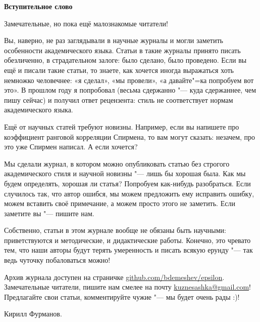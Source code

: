 \documentclass[11pt]{article}
\begin{document}
\pagestyle{empty}

\begin{center}
\Large\textbf{Вступительное слово}
\end{center}


Замечательные, но пока ещё малознакомые читатели!

Вы, наверно, не раз заглядывали в научные журналы и могли заметить особенности академического языка. Статьи в такие журналы принято писать обезличенно, в страдательном залоге: было сделано, было проведено. Если вы ещё и писали такие статьи, то знаете, как хочется иногда выражаться хоть немножко человечнее: «я сделал», «мы провели», «а давайте"=ка попробуем вот это». В прошлом году я попробовал (весьма сдержанно "--- куда сдержаннее, чем пишу сейчас) и получил ответ рецензента: стиль не соответствует нормам академического языка.

Ещё от научных статей требуют новизны. Например, если вы напишете про коэффициент ранговой корреляции Спирмена, то вам могут сказать: незачем, про это уже Спирмен написал. А если хочется?

Мы сделали журнал, в котором можно опубликовать статью без строгого академического стиля и научной новизны "--- лишь бы хорошая была. Как мы будем определять, хорошая ли статья? Попробуем как-нибудь разобраться. Если случилось так, что автор ошибся, мы можем предложить ему исправить ошибку, можем вставить своё примечание, а можем просто этого не заметить. Если заметите вы "--- пишите нам.

Собственно, статьи в этом журнале вообще не обязаны быть научными: приветствуются и методические, и дидактические работы. Конечно, это чревато тем, что наши авторы будут терять умеренность и писать всякую ерунду "--- так ведь чуточку побаловаться можно!

Архив журнала доступен на страничке \href{http://bdemeshev.github.io/epsilon/}{github.com/bdemeshev/epsilon}. Замечательные читатели, пишите нам смелее на почту \href{mailto:kuznesashka@gmail.com}{kuznesashka@gmail.com}! Предлагайте свои статьи, комментируйте чужие "--- мы будет очень рады :)!


\begin{flushright}
Кирилл Фурманов.
\end{flushright}
\end{document}
